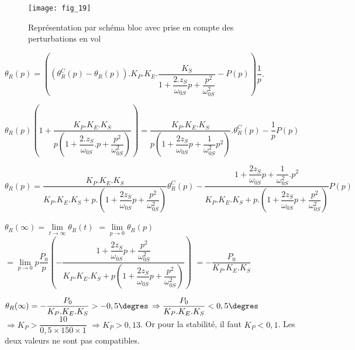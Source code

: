 \begin{figure}[H]
\centering
\texttt{[image: fig\_19]}
\caption{\label{fig_ccinppsi2022:19} Représentation par schéma bloc avec prise en compte des perturbations en vol}
\end{figure}


\ifprof
\begin{corrige}
$\theta_R (p)=\left(\left( \theta_R^C (p)-\theta_R (p)\right) .K_P.K_E.\dfrac{K_S}{1+\dfrac{2.z_S}{\omega_{0S}} p+\dfrac{p^2}{\omega_{0S}^2} }-P(p)\right) \dfrac{1}{p}$.

$\theta_R (p) \left(1+\dfrac{K_P.K_E.K_S}{p\left(1+\dfrac{2.z_S}{\omega_{0S}} .p+\dfrac{p^2}{\omega_{0S}^2} \right) }\right)= \dfrac{K_P.K_E.K_S}{p\left(1+\dfrac{2 z_S}{\omega_{0S}}p+\dfrac{1}{\omega_{0S}^2} p^2 \right) }.\theta_R^C (p)-\dfrac{1}{p} P(p)$

$\theta_R (p)
= \dfrac{K_P.K_E.K_S}{K_P.K_E.K_S+p.\left(1+\dfrac{2 z_S}{\omega_{0S}}p+\dfrac{p^2}{\omega_{0S}^2} \right)}\theta_R^C (p)
-\dfrac{1+\dfrac{2z_S}{\omega_{0S}}p+\dfrac{1}{\omega_{0S}^2}.p^2}{K_P.K_E.K_S+p.\left(1+\dfrac{2z_S}{\omega_{0S}}p+\dfrac{p^2}{\omega_{0S}^2} \right)}P(p)$

\end{corrige}
\else
\fi

\ifprof
\begin{corrige}
$\theta_R(\infty)=\lim\limits_{t \to \infty}  \theta_R (t) $
$=\lim\limits_{p \to 0}  \theta_R (p)$
$=\lim\limits_{p \to 0} p \dfrac{P_0}{p} \left (-\dfrac{1+\dfrac{2 z_S}{\omega_{0S}}p+\dfrac{p^2}{\omega_{0S}^2}}{K_P.K_E.K_S+p\left(1+\dfrac{2 z_S}{\omega_{0S}}p+\dfrac{p^2}{\omega_{0S}^2}\right)} \right) $
$=-\dfrac{P_0}{K_P.K_E.K_S}$
\end{corrige}
\else
\fi

\ifprof
\begin{corrige}
$\theta_R(\infty)=-\dfrac{P_0}{K_P.K_E.K_S }>-0,5\degres$ 
$\Rightarrow \dfrac{P_0}{K_P.K_E.K_S }<0,5\degres$
$\Rightarrow K_P>\dfrac{10}{0,5\times 150\times 1}$
$\Rightarrow K_P>0,13$.
Or pour la stabilité, il faut $K_P<0,1$. Les deux valeurs ne sont pas compatibles.

\end{corrige}
\else
\fi

